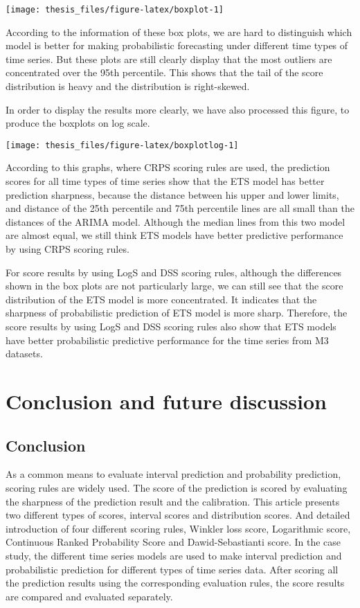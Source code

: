 \documentclass{monashthesis}
\theoremstyle{definition}
\theoremstyle{definition}
\theoremstyle{definition}
\theoremstyle{remark}
\begin{document}
\texttt{[image: thesis\_files/figure-latex/boxplot-1]}

According to the information of these box plots, we are hard to
distinguish which model is better for making probabilistic forecasting
under different time types of time series. But these plots are still
clearly display that the most outliers are concentrated over the 95th
percentile. This shows that the tail of the score distribution is heavy
and the distribution is right-skewed.

In order to display the results more clearly, we have also processed
this figure, to produce the boxplots on log scale.

\texttt{[image: thesis\_files/figure-latex/boxplotlog-1]}

According to this graphs, where CRPS scoring rules are used, the
prediction scores for all time types of time series show that the ETS
model has better prediction sharpness, because the distance between his
upper and lower limits, and distance of the 25th percentile and 75th
percentile lines are all small than the distances of the ARIMA model.
Although the median lines from this two model are almost equal, we still
think ETS models have better predictive performance by using CRPS
scoring rules.

For score results by using LogS and DSS scoring rules, although the
differences shown in the box plots are not particularly large, we can
still see that the score distribution of the ETS model is more
concentrated. It indicates that the sharpness of probabilistic
prediction of ETS model is more sharp. Therefore, the score results by
using LogS and DSS scoring rules also show that ETS models have better
probabilistic predictive performance for the time series from M3
datasets.

\chapter{Conclusion and future
discussion}\label{conclusion-and-future-discussion}

\section{Conclusion}\label{conclusion}

As a common means to evaluate interval prediction and probability
prediction, scoring rules are widely used. The score of the prediction
is scored by evaluating the sharpness of the prediction result and the
calibration. This article presents two different types of scores,
interval scores and distribution scores. And detailed introduction of
four different scoring rules, Winkler loss score, Logarithmic score,
Continuous Ranked Probability Score and Dawid-Sebastianti score. In the
case study, the different time series models are used to make interval
prediction and probabilistic prediction for different types of time
series data. After scoring all the prediction results using the
corresponding evaluation rules, the score results are compared and
evaluated separately.
\end{document}

